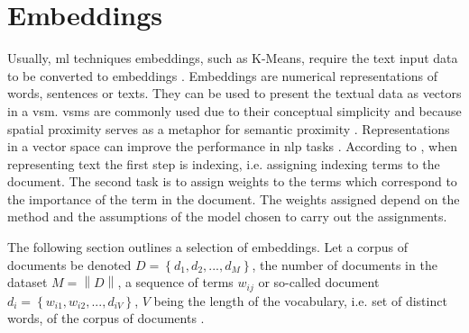 \section{Embeddings}\label{sec:embeddings}

Usually, \ac{ml} techniques embeddings, such as K-Means, require the text input data to be converted to embeddings \cite{SentRep2014}.
Embeddings are numerical representations of words, sentences or texts.
They can be used to present the textual data as vectors in a \ac{vsm}.
\acp{vsm} are commonly used due to their conceptual simplicity and because spatial proximity serves as a metaphor for semantic proximity \cite{tfidf2008, UniversalSentEnc2018}.
Representations in a vector space can improve the performance in \ac{nlp} tasks \cite{SkipGram2013}.
According to \citeauthor{tfidf2008}, when representing text the first step is indexing, i.e. assigning indexing terms to the document.
The second task is to assign weights to the terms which correspond to the importance of the term in the document.
The weights assigned depend on the method and the assumptions of the model chosen to carry out the assignments.

The following section outlines a selection of embeddings.
Let a corpus of documents be denoted $D= \left\{d_1, d_2, ..., d_M  \right\}$, the number of documents in the dataset $M = \left\| D \right\|$,
a sequence of terms $w_{ij}$ or so-called document $d_i = \left\{w_{i1}, w_{i2}, ..., d_{iV}  \right\}$, $V$ being the length of the vocabulary, 
i.e. set of distinct words, of the corpus of documents \cite{clusteringDocs2020}.










